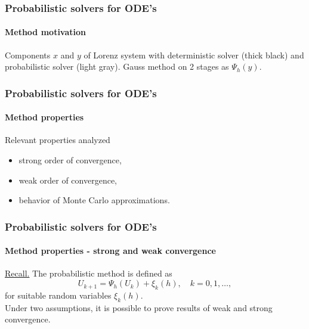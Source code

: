 \documentclass{beamer}
\begin{document}
\begin{frame}
	\frametitle{Probabilistic solvers for ODE's}
	\framesubtitle{Method motivation}
	
	\begin{figure}[t]
		\centering
		\begin{subfigure}{1\linewidth}
			\resizebox{1.0\linewidth}{!}{}
		\end{subfigure}
		\begin{subfigure}{1\linewidth}
			\resizebox{1.0\linewidth}{!}{}
		\end{subfigure}
	\end{figure}

	Components $x$ and $y$ of Lorenz system with deterministic solver (thick black) and probabilistic solver (light gray). Gauss method on 2 stages as $\Psi_h(y)$.
\end{frame}

\begin{frame}
	\frametitle{Probabilistic solvers for ODE's}
	\framesubtitle{Method properties}
	
	Relevant properties analyzed
	\begin{itemize}
		\item strong order of convergence,
		\item weak order of convergence,
		\item behavior of Monte Carlo approximations.
	\end{itemize}
	
\end{frame}


\begin{frame}
	\frametitle{Probabilistic solvers for ODE's}
	\framesubtitle{Method properties - strong and weak convergence \cite{CGS16}}
	
	\underline{Recall.} The probabilistic method is defined as
	\begin{equation*}
		U_{k+1} = \Psi_h(U_k) + \xi_k(h), \quad k = 0, 1, \ldots,
	\end{equation*}
	for suitable random variables $\xi_k(h)$. \\[0.5cm]
	
	Under two assumptions, it is possible to prove results of weak and strong convergence.
	
\end{frame}
	
\end{document}
